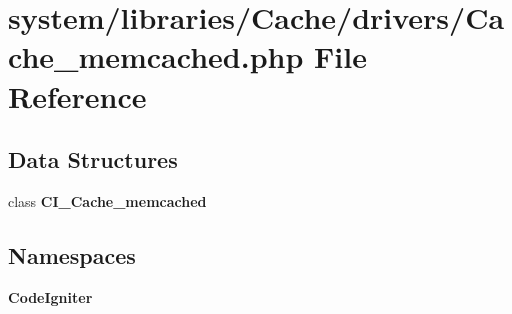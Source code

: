 \section{system/libraries/\-Cache/drivers/\-Cache\-\_\-memcached.php File Reference}
\label{_cache__memcached_8php}
\subsection*{Data Structures}
\begin{DoxyCompactItemize}
\item 
class {\bf C\-I\-\_\-\-Cache\-\_\-memcached}
\end{DoxyCompactItemize}
\subsection*{Namespaces}
\begin{DoxyCompactItemize}
\item 
{\bf Code\-Igniter}
\end{DoxyCompactItemize}
